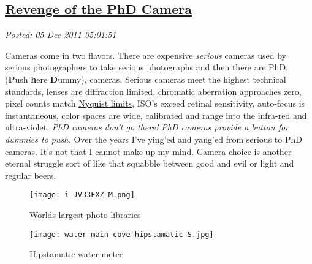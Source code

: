 %

\subsection*{\href{http://bakerjd99.wordpress.com/2011/12/04/revenge-of-the-phd-camera/}{Revenge of the PhD Camera}}


\noindent\emph{Posted: 05 Dec 2011 05:01:51}
\vspace{6pt}

Cameras come in two flavors. There are expensive \emph{serious} cameras
used by serious photographers to take serious photographs and then there
are PhD, (\textbf{P}ush \textbf{h}ere \textbf{D}ummy), cameras. Serious
cameras meet the highest technical standards, lenses are diffraction
limited, chromatic aberration approaches zero, pixel counts match
\href{http://www.normankoren.com/Tutorials/MTF2.html}{Nyquist limits},
ISO's exceed retinal sensitivity, auto-focus is instantaneous, color
spaces are wide, calibrated and range into the infra-red and
ultra-violet. \emph{PhD cameras don't go there! PhD cameras provide a
button for dummies to push.} Over the years I've ying'ed and yang'ed
from serious to PhD cameras. It's not that I cannot make up my mind.
Camera choice is another eternal struggle sort of like that squabble
between good and evil or light and regular beers.


\captionsetup[figure]{labelformat=empty}
\begin{figure}[ht]
\begin{minipage}[b]{0.50\textwidth}
\centering
\href{http://1000memories.com/blog/94-number-of-photos-ever-taken-digital-and-analog-in-shoebox}{\texttt{[image: i-JV33FXZ-M.png]}}
\caption{Worlds largest photo libraries}
\label{fig:2215X1}
\end{minipage}
\begin{minipage}[b]{0.50\textwidth}
\centering
\href{http://conceptcontrol.smugmug.com/Themes/Diaries/Cell-Phoning-It-In/17756793\_PfCsJz}{\texttt{[image: water-main-cove-hipstamatic-S.jpg]}}
\caption{Hipstamatic water  meter}
\label{fig:2215X0}
\end{minipage}
\end{figure}



